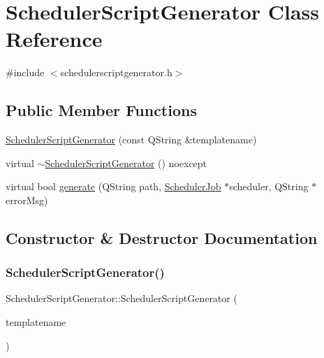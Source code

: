 \hypertarget{class_scheduler_script_generator}{}\section{Scheduler\+Script\+Generator Class Reference}
\label{class_scheduler_script_generator}


{\ttfamily \#include $<$schedulerscriptgenerator.\+h$>$}

\subsection*{Public Member Functions}
\begin{DoxyCompactItemize}
\item 
\mbox{\hyperlink{class_scheduler_script_generator_adcf9d9d1d1ea41e850fa670ee0e4f414}{Scheduler\+Script\+Generator}} (const Q\+String \&templatename)
\item 
virtual \mbox{\hyperlink{class_scheduler_script_generator_af33a4fc8890bd645aa8dda533959af5b}{$\sim$\+Scheduler\+Script\+Generator}} () noexcept
\item 
virtual bool \mbox{\hyperlink{class_scheduler_script_generator_ab5924c8eeff404d22858378c8ba6c52c}{generate}} (Q\+String path, \mbox{\hyperlink{class_scheduler_job}{Scheduler\+Job}} $\ast$scheduler, Q\+String $\ast$error\+Msg)
\end{DoxyCompactItemize}


\subsection{Constructor \& Destructor Documentation}
\mbox{\label{class_scheduler_script_generator_adcf9d9d1d1ea41e850fa670ee0e4f414}} 
\subsubsection{\texorpdfstring{SchedulerScriptGenerator()}{SchedulerScriptGenerator()}}
{\footnotesize\ttfamily Scheduler\+Script\+Generator\+::\+Scheduler\+Script\+Generator (\begin{DoxyParamCaption}\item[{const Q\+String \&}]{templatename }\end{DoxyParamCaption})\hspace{0.3cm}{\ttfamily [explicit]}}

